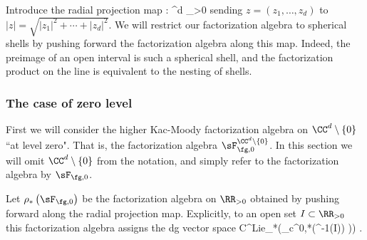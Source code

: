 Introduce the radial projection map
\ben
\rho : \CC^d  \to \RR_{>0}
\een
sending $z = (z_1, \ldots, z_d)$ to $|z| = \sqrt{|z_1|^2 + \cdots + |z_d|^2}$. 
We will restrict our factorization algebra to spherical shells by pushing forward the factorization algebra along this map.
Indeed, the preimage of an open interval is such a spherical shell, and the factorization product on the line is equivalent to the nesting of shells. 

\subsubsection{The case of zero level}

First we will consider the higher Kac-Moody factorization algebra on $\CC^d \setminus \{0\}$ ``at level zero". That is, the factorization algebra $\sF^{\CC^d \setminus \{0\} }_{\fg, 0}$.
In this section we will omit $\CC^d \setminus \{0\}$ from the notation, and simply refer to the factorization algebra by $\sF_{\fg,0}$. 

Let $\rho_* \left(\sF_{\fg,0}\right)$ be the factorization algebra on $\RR_{>0}$ obtained by pushing forward along the radial projection map. Explicitly, to an open set $I \subset \RR_{>0}$ this factorization algebra assigns the dg vector space
\ben
{\rm C}^{\rm Lie}_*\left(\Omega_c^{0,*}(\rho^{-1}(I)) \tensor \fg)\right) .
\een


